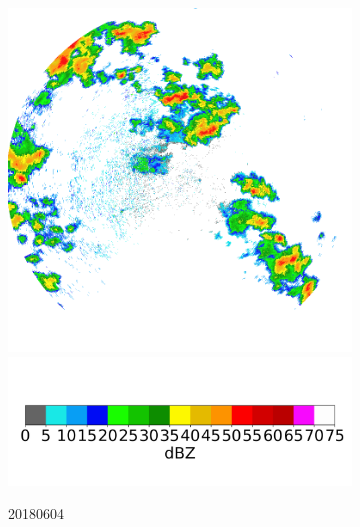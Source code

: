 \begin{figure}[h]
	\centering
	\begin{subfigure}[b]{0.45\textwidth}
		\includegraphics[width=\textwidth]{./thesis_code/plots/midlothian-tx-20180604-115830-ref.png}
		\includegraphics[width=\textwidth]{./thesis_code/plots/dfw_colormap.png}
		\caption{20180604}
		\label{fig:classifying_datadiscovery_ex1}
	\end{subfigure}
	\begin{subfigure}[b]{0.45\textwidth}

\end{subfigure}
\end{figure}
